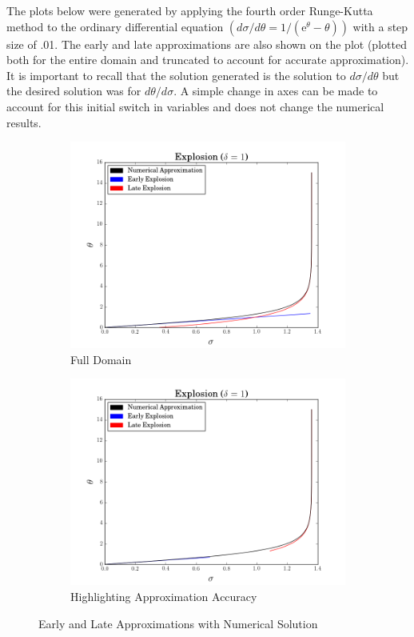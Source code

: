 \documentclass{article}
\begin{document}
The plots below were generated by applying the fourth order Runge-Kutta method to the ordinary differential equation $(d\sigma/d\theta = 1/(\text{e}^{\theta}-\theta))$ with a step size of .01.  The early and late approximations are also shown on the plot (plotted both for the entire domain and truncated to account for accurate approximation).  It is important to recall that the solution generated is the solution to $d\sigma/d\theta$ but the desired solution was for $d\theta/d\sigma$.  A simple change in axes can be made to account for this initial switch in variables and does not change the numerical results.  
\begin{figure}[H]
\begin{center}
\begin{subfigure}{.5\textwidth}
  \centering
  \includegraphics[scale = .4]{explosion}
  \caption{Full Domain}
  \label{fig:sub1}
\end{subfigure}%
\begin{subfigure}{.5\textwidth}
  \centering
  \includegraphics[scale = .4]{expapprox}
  \caption{Highlighting Approximation Accuracy}
  \label{fig:sub2}
\end{subfigure}
\caption{Early and Late Approximations with Numerical Solution}
\label{fig:test}
\end{center}
\end{figure}
\end{document}
